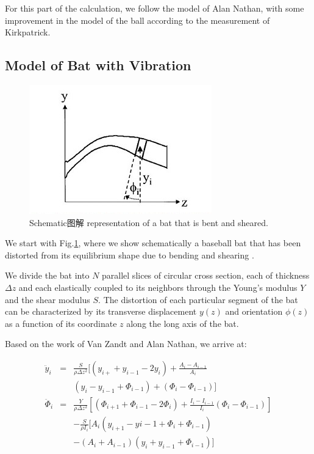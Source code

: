 \documentclass[12pt]{article}
\begin{document}
For this part of the calculation, we follow the model of Alan Nathan\cite{NathanNovember2000}, with some improvement in
the model of the ball according to the measurement of Kirkpatrick\cite{Kirkpatrick1963}.

\subsection{Model of Bat with Vibration}

\begin{center}
\begin{figure}[htpb]
\centering
\includegraphics[scale=0.8]{batmodel}
\caption{Schematic{图解}
representation of a bat that is bent
and sheared.}\label{fig:batmodel}
\end{figure}
\end{center}

We start with Fig.\ref{fig:batmodel},
where we show schematically a baseball bat
that has been distorted from its equilibrium shape due to bending and shearing .

We divide the bat into $N$ parallel slices of circular cross section,
each of thickness $\Delta z$ and each elastically coupled to its neighbors
through the Young's modulus $Y$ and the shear modulus $S$.
The distortion of each particular segment of the bat
can be characterized by its transverse displacement $y(z)$ and orientation $\phi(z)$
as a function of its coordinate $z$ along the long axis of the bat.

Based on the work of Van Zandt\cite{Zandt1992} and Alan Nathan\cite{NathanNovember2000},
we arrive at:

\begin{eqnarray}
\ddot{y}_i&=&\frac{S}{\rho\Delta z^2}
[(y_{i+}+y_{i-1}-2y_i)+\frac{A_i-A_{i-1}}{A_i}  \label{equ:yddot}\\
&&(y_i-y_{i-1}+\Phi_{i-1})+(\Phi_i-\Phi_{i-1})] \nonumber\\
\ddot{\Phi}_i&=&\frac{Y}{\rho\Delta z^2}[(\Phi_{i+1}+\Phi_{i-1}-2\Phi_i)+
\frac{I_i-I_{i-1}}{I_i}(\Phi_i-\Phi_{i-1})] \nonumber \\
&&-\frac{S}{\rho I_i}[A_i(y_{i+1}-y{i-1}+\Phi_{i}+\Phi_{i-1}) \label{equ:phiddot} \\
&&-(A_{i}+A_{i-1})(y_{i}+y_{i-1}+\Phi_{i-1})]  \nonumber
\end{eqnarray}
\end{document}
